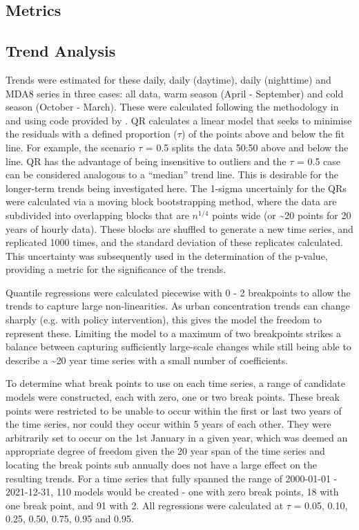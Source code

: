 \documentclass[journal abbreviation, manuscript]{copernicus}
\begin{document}
\subsection{Metrics}

\subsection{Trend Analysis}
Trends were estimated for these daily, daily (daytime), daily (nighttime) and MDA8 series in three cases: all data, warm season (April - September) and cold season (October - March). These were calculated following the methodology in and using code provided by  \cite{chang2023guidancenotebeststatistical}. QR calculates a linear model that seeks to minimise the residuals with a defined proportion ($\tau$) of the points above and below the fit line. For example, the scenario $\tau$ = 0.5 splits the data 50:50 above and below the line. QR has the advantage of being insensitive to outliers and the $\tau$ = 0.5 case can be considered analogous to a “median” trend line. This is desirable for the longer-term trends being investigated here. The 1-sigma uncertainly for the QRs were calculated via a moving block bootstrapping method, where the data are subdivided into overlapping blocks that are $n^{1/4}$ points wide (or \textasciitilde{20} points for 20 years of hourly data). These blocks are shuffled to generate a new time series, and replicated 1000 times, and the standard deviation of these replicates calculated. This uncertainty was subsequently used in the determination of the p-value, providing a metric for the significance of the trends. 

Quantile regressions were calculated piecewise with 0 - 2 breakpoints to allow the trends to capture large non-linearities. As urban concentration trends can change sharply (e.g. with policy intervention), this gives the model the freedom to represent these. Limiting the model to a maximum of two breakpoints strikes a balance between capturing sufficiently large-scale changes while still being able to describe a \textasciitilde{20} year time series with a small number of coefficients.

To determine what break points to use on each time series, a range of candidate models were constructed, each with zero, one or two break points. These break points were restricted to be unable to occur within the first or last two years of the time series, nor could they occur within 5 years of each other. They were arbitrarily set to occur on the 1st January in a given year, which was deemed an appropriate degree of freedom given the 20 year span of the time series and locating the break points sub annually does not have a large effect on the resulting trends. For a time series that fully spanned the range of 2000-01-01 - 2021-12-31, 110 models would be created - one with zero break points, 18 with one break point, and 91 with 2. All regressions were calculated at $\tau$ = 0.05, 0.10, 0.25, 0.50, 0.75, 0.95 and 0.95.
\end{document}
